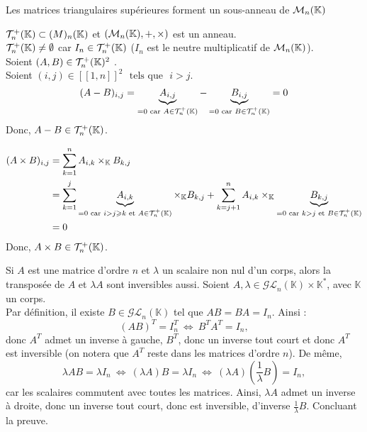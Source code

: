 \documentclass{article}
\renewenvironment{question_kholle}[2][ ]
{
	\subsection{\texorpdfstring{#2}{}}
	\notblank{#1}
	{
		\noindent #1
		\bigbreak
	}
	{}
	\begin{proof}
}
{
	\end{proof}
}
\begin{document}
\begin{question_kholle}
	{Les matrices triangulaires supérieures forment un sous-anneau de $\mathcal{M}_n(\mathbb K)$}

	$\mathcal{T}_n^+(\mathbb K) \subset \mathcal(M)_n(\mathbb K)$ et $(\mathcal{M}_n(\mathbb K), +, \times)$ est un anneau. \\
	$\mathcal{T}_n^+(\mathbb K) \neq \emptyset$ car $I_n \in \mathcal{T}_n^+(\mathbb K)$ ($I_n$ est le neutre multiplicatif de $\mathcal{M}_n(\mathbb K)$). \\
	Soient $(A, B) \in \mathcal{T}_n^+(\mathbb K)^2$ . \\
	Soient $(i, j) \in [\![1,n]\!]^2$ $\text{ tels que }$ $i > j$.
	\begin{equation*}
		(A - B)_{i,j}
		= \underbrace{A_{i,j}}_{=0 \text{ car } A \in \mathcal{T}_n^+(\mathbb K)} - \underbrace{B_{i,j}}_{=0 \text{ car } B \in \mathcal{T}_n^+(\mathbb K)}
		= 0
	\end{equation*}
	Donc, $A - B \in \mathcal{T}_n^+(\mathbb K)$.

	\begin{equation*}
		\begin{aligned}
			(A \times B)_{i,j}
			 & = \sum_{k=1}^{n} A_{i,k} \times_{\mathbb K} B_{k,j}                                                                                        \\
			 & = \sum_{k=1}^{j} \underbrace{A_{i,k}}_{=0 \text{ car } i > j \geqslant k \text{ et } A \in \mathcal{T}_n^+(\mathbb K)} \times_{\mathbb K} B_{k,j}
			+ \sum_{k=j+1}^{n} A_{i,k} \times_{\mathbb K} \underbrace{B_{k,j}}_{=0 \text{ car } k > j \text{ et } B \in \mathcal{T}_n^+(\mathbb K)}              \\
			 & = 0
		\end{aligned}
	\end{equation*}
	Donc, $A \times B \in \mathcal{T}_n^+(\mathbb K)$.
\end{question_kholle}

\begin{question_kholle}
	{Si $A$ est une matrice d'ordre $n$ et $\lambda$ un scalaire non nul d'un corps, alors la transposée de $A$ et $\lambda A$ sont inversibles aussi.}
	Soient $A,\lambda \in \mathcal{GL}_n(\mathbb{K})\times \mathbb{K}^*$, avec $\mathbb{K}$ un corps. \\
	Par définition, il existe $B\in \mathcal{GL}_n(\mathbb{K})$ tel que $AB=BA=I_n$. Ainsi :
	\[
		(AB)^T = I_n^T \ \iff \ B^TA^T = I_n,
	\]
	donc $A^T$ admet un inverse à gauche, $B^T$, donc un inverse tout court et donc $A^T$ est inversible (on notera que $A^T$ reste dans les matrices d'ordre $n$). De même,
	\[
		\lambda AB = \lambda I_n \ \iff \ (\lambda A)B = \lambda I_n \ \iff \ (\lambda A) \left(\frac{1}{\lambda}B \right) = I_n,
	\]
	car les scalaires commutent avec toutes les matrices. Ainsi, $\lambda A$ admet un inverse à droite, donc un inverse tout court, donc est inversible, d'inverse $\frac{1}{\lambda}B$. Concluant la preuve.
\end{question_kholle}
\end{document}
